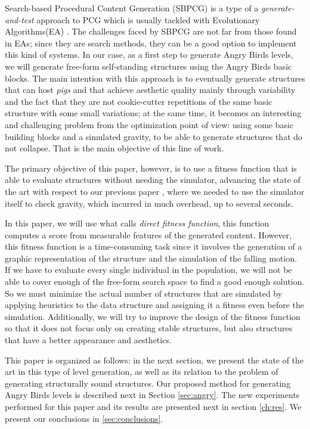 \documentclass[a4paper,twoside]{article}
\begin{document}
Search-based Procedural Content Generation (SBPCG) is a type of a
\textit{generate-and-test} approach to PCG which is usually tackled
with Evolutionary Algorithms(EA) \cite{togelius2010search}. The
challenges faced by SBPCG are not far from those found in EAs; since
they are search methods, they can be a good option to implement this
kind of systems. In our case, as a first step to generate Angry Birds
levels, we will generate free-form self-standing structures using the Angry
Birds basic blocks. The main intention with this approach is to
eventually generate structures that can host {\em pigs} and that
achieve aesthetic quality mainly through variability and the fact that
they are not cookie-cutter repetitions of the same basic structure
with some small variations; at the same time,
it becomes an interesting and challenging problem from the
optimization point of view: using some basic building blocks and a
simulated gravity, to be able to generate structures that do not
collapse. That is the main objective of this line of work.

The primary objective of this paper, however, is to use a fitness function that is
able to evaluate structures without needing the simulator, advancing
the state of the art with respect to our previous paper
\cite{DBLP:conf/evoW/CalleGGV19}, where we needed to use the simulator
itself to check gravity, which incurred in much overhead, up to
several seconds.

In this paper, we will use what \cite{togelius2010search} calls {\em
  direct fitness function}, this function computes a score from
measurable features of the generated content. However, this fitness
function is a time-consuming task since it involves the generation of
a graphic representation of the structure and the simulation of the
falling motion. If we have to evaluate every single individual in the
population, we will not be able to cover enough of the free-form
search space to find a good enough solution. So we must minimize the
actual number of structures that are simulated by applying heuristics
to the data structure and assigning it a fitness even before the
simulation. Additionally, we will try to improve the design of the
fitness function so that it does not focus only on creating stable
structures, but also structures that have a better appearance and
aesthetics. 


This paper is organized as follows: in the next section, we present
the state of the art in this type of level generation, as well as its
relation to the problem of generating structurally sound
structures. Our proposed method for generating Angry Birds levels is
described next in Section \ref{sec:angry}. The new experiments
performed for this paper and its results are presented next in section
\ref{ch:res}. We present our conclusions in 
\ref{sec:conclusions}.
\end{document}
